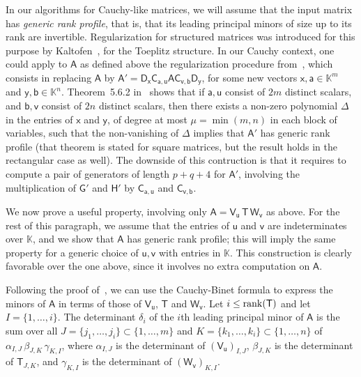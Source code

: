 \documentclass[sigconf]{acmart}
\newcommand{\va}{\ensuremath{\mathsf{a}}}
\newcommand{\vb}{\ensuremath{\mathsf{b}}}
\newcommand{\vu}{\ensuremath{\mathsf{u}}}
\newcommand{\vv}{\ensuremath{\mathsf{v}}}
\newcommand{\vx}{\ensuremath{\mathsf{x}}}
\newcommand{\vy}{\ensuremath{\mathsf{y}}}
\newcommand{\mA}{\ensuremath{\mathsf{A}}}
\newcommand{\mC}{\ensuremath{\mathsf{C}}}
\newcommand{\mD}{\ensuremath{\mathsf{D}}}
\newcommand{\mG}{\ensuremath{\mathsf{G}}}
\newcommand{\mH}{\ensuremath{\mathsf{H}}}
\newcommand{\mT}{\ensuremath{\mathsf{T}}}
\newcommand{\mV}{\ensuremath{\mathsf{V}}}
\newcommand{\mW}{\ensuremath{\mathsf{W}}}
\newcommand{\K}{\ensuremath{\mathbb{K}}}
\newcommand{\mn}{\ensuremath{\mu}}
\theoremstyle{acmdefinition}
\begin{document}
\smallskip{}  In our algorithms for
Cauchy-like matrices, we will assume that the input matrix has {\em
  generic rank profile}, that is, that its leading principal minors of
size up to its rank are invertible.  Regularization for structured
matrices was introduced for this purpose by
Kaltofen~\cite{Kaltofen94}, for the Toeplitz structure. In our Cauchy
context, one could apply to $\mA$ as defined above the regularization
procedure from~\cite[Section~5.6]{Pan01}, which consists in replacing
$\mA$ by $\mA' = \mD_\vx \mC_{\va,\vu} \mA \mC_{\vv,\vb}\mD_\vy$,
for some new vectors $\vx,\va \in \K^m$ and $\vy,\vb \in
\K^n$. Theorem~5.6.2 in~\cite{Pan01} shows that if $\va,\vu$ consist
of $2m$ distinct scalars, and $\vb,\vv$ consist of $2n$ distinct
scalars, then there exists a non-zero polynomial $\Delta$ in the
entries of $\vx$ and $\vy$, of degree at most $\mn=\min(m,n)$ in each
block of variables, such that the non-vanishing of $\Delta$ implies
that $\mA'$ has generic rank profile (that theorem is stated for
square matrices, but the result holds in the rectangular case as
well).  The downside of this contruction is that it requires to
compute a pair of generators of length $p+q+4$ for $\mA'$, involving
the multiplication of $\mG'$ and $\mH'$ by $\mC_{\va,\vu}$ and
$\mC_{\vv,\vb}$.

\smallskip

We now prove a useful property, involving only  $\mA = \mV_\vu\, \mT\,
\mW_\vv$ as above. For the rest of this paragraph, we assume that the
entries of $\vu$ and $\vv$ are indeterminates over $\K$, and we show
that $\mA$ has generic rank profile; this will imply the same
property for a generic choice of $\vu,\vv$ with entries in
$\K$. This construction is clearly favorable over the one above, since
it involves no extra computation on $\mA$.

Following the proof of~\cite[Theorem~5.6.2]{Pan01}, we can use the
Cauchy-Binet formula to express the minors of $\mA$ in terms of those
of $\mV_\vu$, $\mT$ and $\mW_\vv$. Let $i \le {\rm
  rank}(\mT)$ and let $I=\{1,\dots,i\}$. The determinant $\delta_i$ of
the $i$th leading principal minor of $\mA$ is the sum over all
$J=\{j_1,\dots,j_i\} \subset \{1,\dots,m\}$ and $K=\{k_1,\dots,k_i\}
\subset \{1,\dots,n\}$ of  $\alpha_{I,J}\, \beta_{J,K}\,
\gamma_{K,I}$, where $\alpha_{I,J}$ is the determinant of
$(\mV_\vu)_{I,J}$, $\beta_{J,K}$ is the determinant of $\mT_{J,K}$,
and $\gamma_{K,I}$ is the determinant of $(\mW_\vv)_{K,I}$.
\end{document}
